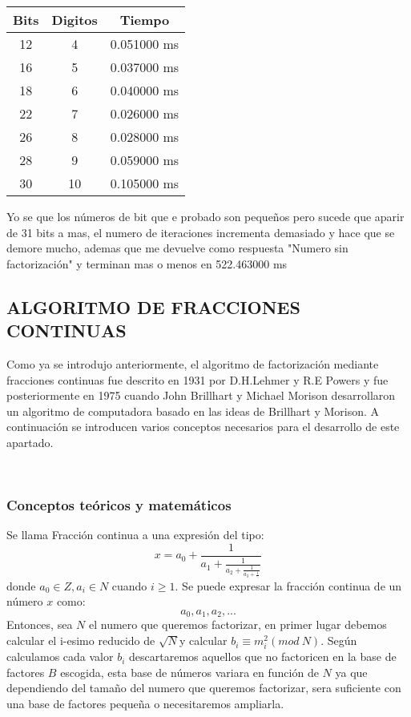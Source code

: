 \documentclass[11pt, conference]{IEEEtran}
\begin{document}
\begin{table}[htb]
	\begin{center}
		\begin{tabular}{|c|c|c|}
			\hline
			Bits & Digitos & Tiempo\\
			\hline
			12 & 4 & 0.051000 ms \\\hline
			16 & 5 & 0.037000 ms \\\hline
			18 & 6 & 0.040000 ms \\\hline
			22 & 7 & 0.026000 ms \\\hline
			26 & 8 & 0.028000 ms \\\hline
			28 & 9 & 0.059000 ms \\\hline
			30 & 10 & 0.105000 ms \\
			\hline
		\end{tabular}
	\end{center}
\end{table}

Yo se que los números de bit que e probado son pequeños pero sucede que aparir de 31 bits a mas, el numero de iteraciones incrementa demasiado y hace que se demore mucho, ademas que me devuelve como respuesta "Numero sin factorización" y terminan mas o menos en 522.463000 ms










\subsection[Algoritmo de fracciones continuas]{\textbf{ALGORITMO DE FRACCIONES CONTINUAS}}
Como ya se introdujo anteriormente, el algoritmo de factorización mediante fracciones continuas fue descrito en 1931 por D.H.Lehmer y R.E Powers y fue posteriormente en 1975 cuando John Brillhart y Michael Morison desarrollaron un algoritmo de computadora basado en las ideas de Brillhart y Morison. A continuación se introducen varios conceptos necesarios para el desarrollo de este apartado.
\cite{a}\cite{b}

\

\subsubsection[Conceptos teóricos y matemáticos]{\textbf{Conceptos teóricos y matemáticos}}
Se llama Fracción continua a una expresión del tipo:
\[
	x = a_0 + \frac{1}{a_1 + \frac{1}{a_2 + \frac{1}{a_3+\frac{1}{\ddots}}}}
\]
donde $a_0\in Z, a_i\in N$ cuando $i\geq1$. Se puede expresar la fracción continua de un número $x$ como:
\[a_0, a_1, a_2,...\]
Entonces, sea $N$ el numero que queremos factorizar, en primer lugar debemos calcular el i-esimo reducido de $\sqrt{N}$y calcular $b_i\equiv m_i^2(mod\ N)$. Según calculamos cada valor $b_i$ descartaremos aquellos que no factoricen en la base de factores $B$ escogida, esta base de números variara en función de $N$ ya que dependiendo del tamaño del numero que queremos factorizar, sera suficiente con una base de factores pequeña o necesitaremos ampliarla.\\
 
\end{document}
